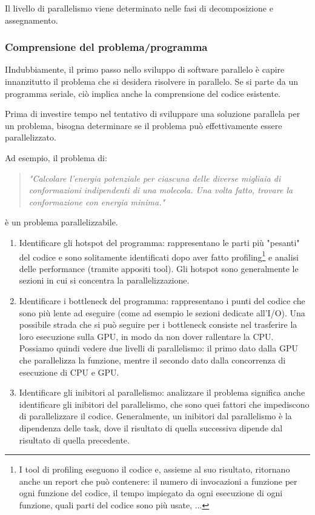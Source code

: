 Il livello di parallelismo viene determinato nelle fasi di decomposizione e assegnamento.

\subsubsection{Comprensione del problema/programma}
IIndubbiamente, il primo passo nello sviluppo di software parallelo è capire innanzitutto il problema che si desidera risolvere in parallelo. Se si parte da un programma seriale, ciò implica anche la comprensione del codice esistente.

Prima di investire tempo nel tentativo di sviluppare una soluzione parallela per un problema, bisogna determinare se il problema può effettivamente essere parallelizzato.

Ad esempio, il problema di:
\begin{quotation}\textit{
	"Calcolare l'energia potenziale per ciascuna delle diverse migliaia di conformazioni indipendenti di una molecola. Una volta fatto, trovare la conformazione con energia minima."}
\end{quotation}
è un problema parallelizzabile.
\begin{enumerate}
    \item Identificare gli hotspot del programma: rappresentano le parti più "pesanti" del codice e sono solitamente identificati dopo aver fatto profiling\footnote{I tool di profiling eseguono il codice e, assieme al suo risultato, ritornano anche un report che può contenere: il numero di invocazioni a funzione per ogni funzione del codice, il tempo impiegato da ogni esecuzione di ogni funzione, quali parti del codice sono più usate, ...} e analisi delle performance (tramite appositi tool). Gli hotspot sono generalmente le sezioni in cui si concentra la parallelizzazione.
    \item Identificare i bottleneck del programma: rappresentano i punti del codice che sono più lente ad eseguire (come ad esempio le sezioni dedicate all'I/O). Una possibile strada che si può seguire per i bottleneck consiste nel trasferire la loro esecuzione sulla GPU, in modo da non dover rallentare la CPU. Possiamo quindi vedere due livelli di parallelismo: il primo dato dalla GPU che parallelizza la funzione, mentre il secondo dato dalla concorrenza di esecuzione di CPU e GPU.
    \item Identificare gli inibitori al parallelismo: analizzare il problema significa anche identificare gli inibitori del parallelismo, che sono quei fattori che impediscono di parallelizzare il codice. Generalmente, un inibitori dal parallelismo è la dipendenza delle task, dove il risultato di quella successiva dipende dal risultato di quella precedente.
\end{enumerate}

